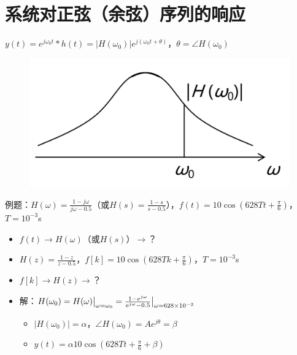 \documentclass[UTF8]{ctexart}
\begin{document}
\section{系统对正弦（余弦）序列的响应}
$y(t)=e^{j\omega_0t}*h(t)=|H(\omega_0)|e^{j(\omega_0t+\theta)}$，$\theta=\angle{H(\omega_0)}$ \par
\begin{figure}[h]
  \centering
  \includegraphics[scale=0.25]{系统对正弦序列的响应.png}
\end{figure}
例题：$H(\omega)=\frac{1-j\omega}{j\omega-0.5}$（或$H(s)=\frac{1-s}{s-0.5}$），$f(t)=10\cos(628Tt+\frac{\pi}{6})$，$T=10^{-3}$s \par
\begin{itemize}[label=,left=4.5em]
  \item $f(t)\rightarrow H(\omega)$（或$H(s)$）$\rightarrow$？
  \item $H(z)=\frac{1-z}{z-0.5}$，$f[k]=10\cos(628Tk+\frac{\pi}{6})$，$T=10^{-3}$s
  \item $f[k]\rightarrow H(z)\rightarrow$？
  \item 解：$H(\omega_0)=H(\omega)\big{|}_{\omega=\omega_0}=\frac{1-e^{j\omega}}{e^{j\omega}-0.5}\big{|}_{\omega=628\times10^{-3}}$
        \begin{itemize}[label=,left=1.5em]
          \item $|H(\omega_0)|=\alpha$，$\angle{H(\omega_0)}=Ae^{j\theta}=\beta$
          \item $y(t)=\alpha10\cos(628Tt+\frac{\pi}{6}+\beta)$
        \end{itemize}
\end{itemize}

\newpage
\end{document}
